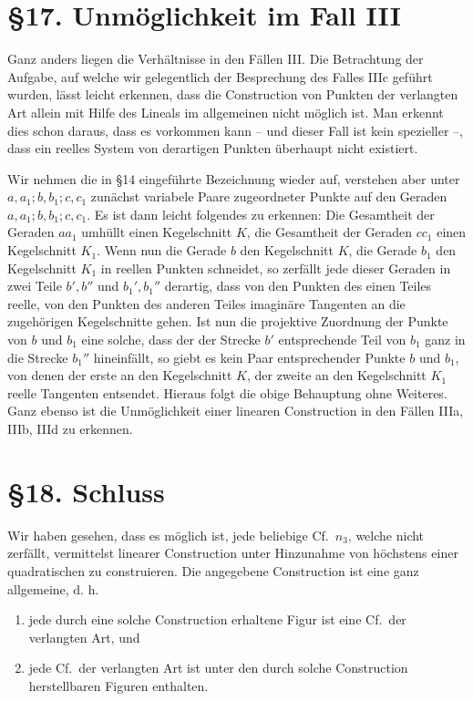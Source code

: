 \documentclass[11pt]{article}
\newcommand{\Cf}{\textup{Cf.}}
\begin{document}
\section*{\S 17. Unmöglichkeit im Fall III}
Ganz anders liegen die Verhältnisse in den Fällen III. Die Betrachtung der Aufgabe, auf welche wir gelegentlich der Besprechung des Falles IIIc geführt wurden, lässt leicht erkennen, dass die Construction von Punkten der verlangten Art allein mit Hilfe des Lineals im allgemeinen nicht möglich ist. Man erkennt dies schon daraus, dass es vorkommen kann -- und dieser Fall ist kein spezieller --, dass ein reelles System von derartigen Punkten überhaupt nicht existiert.

Wir nehmen die in \S 14 eingeführte Bezeichnung wieder auf, verstehen aber unter $a,a_1;b,b_1;c,c_1$ zunächst variabele Paare zugeordneter Punkte auf den Geraden $a,a_1;b,b_1;c,c_1$. Es ist dann leicht folgendes zu erkennen: Die Gesamtheit der Geraden $aa_1$ umhüllt einen Kegelschnitt $K$, die Gesamtheit der Geraden $cc_1$ einen Kegelschnitt $K_1$. Wenn nun die Gerade $b$ den Kegelschnitt $K$, die Gerade $b_1$ den Kegelschnitt $K_1$ in reellen Punkten schneidet, so zerfällt jede dieser Geraden in zwei Teile $b',b''$ und $b_1',b_1''$ derartig, dass von den Punkten des einen Teiles reelle, von den Punkten des anderen Teiles imaginäre Tangenten an die zugehörigen Kegelschnitte gehen. Ist nun die projektive Zuordnung der Punkte von $b$ und $b_1$ eine solche, dass der der Strecke $b'$ entsprechende Teil von $b_1$ ganz in die Strecke $b_1''$ hineinfällt, so giebt es kein Paar entsprechender Punkte $b$ und $b_1$, von denen der erste an den Kegelschnitt $K$, der zweite an den Kegelschnitt $K_1$ reelle Tangenten entsendet. Hieraus folgt die obige Behauptung ohne Weiteres. Ganz ebenso ist die Unmöglichkeit einer linearen Construction in den Fällen IIIa, IIIb, IIId zu erkennen.

\section*{\S 18. Schluss}
Wir haben gesehen, dass es möglich ist, jede beliebige \Cf\ $n_3$, welche nicht zerfällt, vermittelst linearer Construction unter Hinzunahme von höchstens einer quadratischen zu construieren. Die angegebene Construction ist eine ganz allgemeine, d. h.
\begin{enumerate}
\item jede durch eine solche Construction erhaltene Figur ist eine \Cf\ der verlangten Art, und
\item jede \Cf\ der verlangten Art ist unter den durch solche Construction herstellbaren Figuren enthalten.
\end{enumerate}
\end{document}
